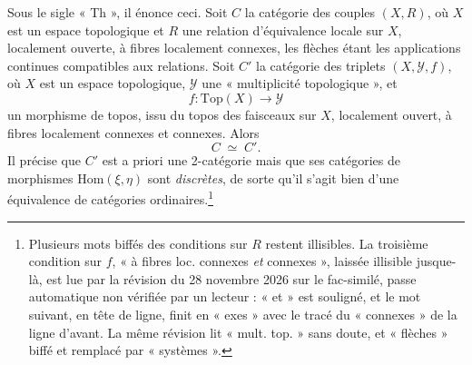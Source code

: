 \documentclass[11pt,a4paper]{article}
\begin{document}
Sous le sigle « Th », il énonce ceci. Soit $C$ la catégorie des couples
$(X, R)$, où $X$ est un espace topologique et $R$ une relation d'équivalence
locale sur $X$, localement ouverte, à fibres localement connexes, les flèches
étant les applications continues compatibles aux relations. Soit $C'$ la
catégorie des triplets $(X, \mathcal{Y}, f)$, où $X$ est un espace
topologique, $\mathcal{Y}$ une « multiplicité topologique », et
\[
  f \colon \mathrm{Top}(X) \longrightarrow \mathcal{Y}
\]
un morphisme de topos, issu du topos des faisceaux sur $X$, localement ouvert,
à fibres localement connexes et connexes. Alors
\[
  C \;\simeq\; C' .
\]
Il précise que $C'$ est a priori une 2-catégorie mais que ses catégories de
morphismes $\mathrm{Hom}(\xi, \eta)$ sont \emph{discrètes}, de sorte qu'il
s'agit bien d'une équivalence de catégories ordinaires.\footnote{Plusieurs
mots biffés des conditions sur $R$ restent illisibles. La troisième condition
sur $f$, « à fibres loc. connexes \emph{et} connexes », laissée illisible
jusque-là, est lue par la révision du 28 novembre 2026 sur le fac-similé,
passe automatique non vérifiée par un lecteur : « et » est souligné, et le mot
suivant, en tête de ligne, finit en « exes » avec le tracé du « connexes »
de la ligne d'avant. La même révision lit « mult. top. » sans doute, et
« flèches » biffé et remplacé par « systèmes ».}
\end{document}

